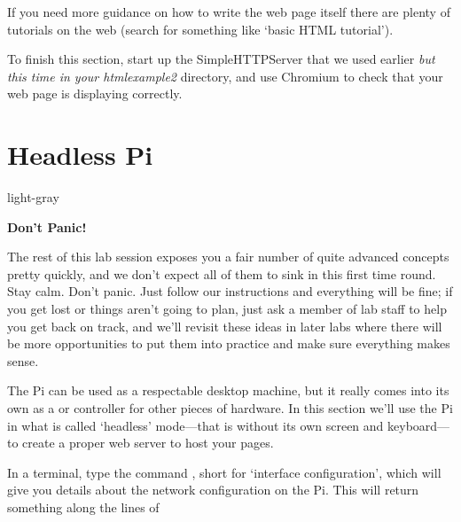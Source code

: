 If you need more guidance on how to write the web page itself there are plenty of tutorials on the web (search for something like `basic HTML tutorial').

To finish this section, start up the SimpleHTTPServer that we used earlier \textit{but this time in your htmlexample2} directory, and use Chromium to check that your web page is displaying correctly.

\FloatBarrier

\section{Headless Pi}
\label{section:headless}

\begin{stdframe}{light-gray}%
  \centerline{\textbf{Don't Panic!}}
The rest of this lab session exposes you a fair number of quite advanced concepts pretty quickly, and we don't expect all of them to sink in this first time round. Stay calm.  Don't panic. Just follow our instructions and everything will be fine; if you get lost or things aren't going to plan, just ask a member of lab staff to help you get back on track, and we'll revisit these ideas in later labs where there will be more opportunities to put them into practice and make sure everything makes sense.
\end{stdframe}

The Pi can be used as a respectable desktop machine, but it really comes into its own as a  or controller for other pieces of hardware. In this section we'll use the Pi in what is called `headless' mode---that is without its own screen and keyboard---to create a proper web server to host your pages.

In a terminal, type the command , short for `interface configuration', which will give you details about the network configuration on the Pi. This will return something along the lines of


